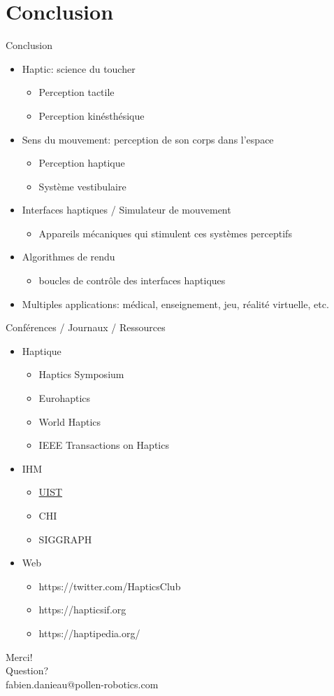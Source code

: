 \section{Conclusion} 
\begin{frame}{Conclusion}
	\begin{itemize}
		\item Haptic: science du toucher
		\begin{itemize}
		\item Perception tactile
		\item Perception kinésthésique
		\end{itemize}
		\item Sens du mouvement: perception de son corps dans l'espace
		\begin{itemize}
		\item Perception haptique
		\item Système vestibulaire
		\end{itemize}
		\item Interfaces haptiques / Simulateur de mouvement
		\begin{itemize}
		\item Appareils mécaniques qui stimulent ces systèmes perceptifs
\end{itemize}
		\item Algorithmes de rendu
		\begin{itemize}
		\item boucles de contrôle des interfaces haptiques
		\end{itemize}
		\item Multiples applications: médical, enseignement, jeu, réalité virtuelle, etc.
	\end{itemize}
\end{frame}	 


\begin{frame}{Conférences / Journaux / Ressources}
	\begin{itemize}
	\item Haptique
	\begin{itemize}
	\item Haptics Symposium
	\item Eurohaptics
	\item World Haptics
	\item IEEE Transactions on Haptics
	\end{itemize}
	\item IHM
	\begin{itemize}
	\item \href{https://www.youtube.com/user/acmsigchi}{UIST}
	\item CHI
	\item SIGGRAPH
	\end{itemize}
	\item Web
	\begin{itemize}
	\item https://twitter.com/HapticsClub
	\item https://hapticsif.org
	\item https://haptipedia.org/
	\end{itemize}
	\end{itemize}

\end{frame}

\begin{frame}[standout]
  Merci! \\
  Question? \\
  fabien.danieau@pollen-robotics.com
\end{frame} 